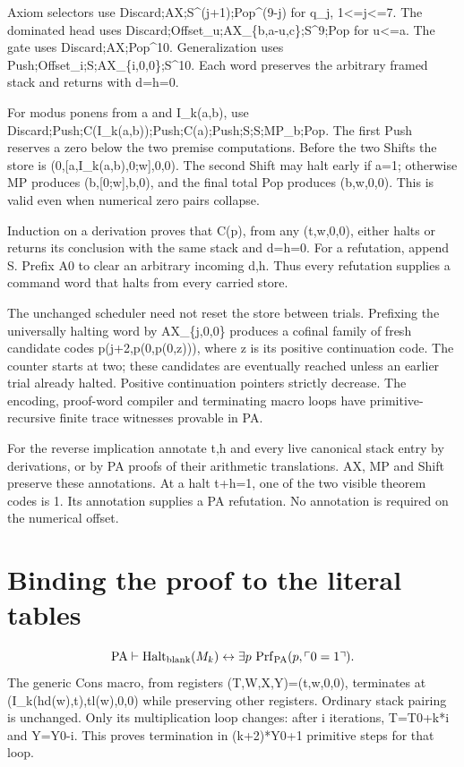 \documentclass[11pt,letterpaper]{article}
\begin{document}
Axiom selectors use Discard;AX;S\textasciicircum{}(j+1);Pop\textasciicircum{}(9-j) for q\_j, 1<=j<=7. The dominated head uses Discard;Offset\_u;AX\_\{b,a-u,c\};S\textasciicircum{}9;Pop for u<=a. The gate uses Discard;AX;Pop\textasciicircum{}10. Generalization uses Push;Offset\_i;S;AX\_\{i,0,0\};S\textasciicircum{}10. Each word preserves the arbitrary framed stack and returns with d=h=0.

For modus ponens from a and I\_k(a,b), use Discard;Push;C(I\_k(a,b));Push;C(a);Push;S;S;MP\_b;Pop. The first Push reserves a zero below the two premise computations. Before the two Shifts the store is (0,[a,I\_k(a,b),0;w],0,0). The second Shift may halt early if a=1; otherwise MP produces (b,[0;w],b,0), and the final total Pop produces (b,w,0,0). This is valid even when numerical zero pairs collapse.

Induction on a derivation proves that C(p), from any (t,w,0,0), either halts or returns its conclusion with the same stack and d=h=0. For a refutation, append S. Prefix A0 to clear an arbitrary incoming d,h. Thus every refutation supplies a command word that halts from every carried store.

The unchanged scheduler need not reset the store between trials. Prefixing the universally halting word by AX\_\{j,0,0\} produces a cofinal family of fresh candidate codes p(j+2,p(0,p(0,z))), where z is its positive continuation code. The counter starts at two; these candidates are eventually reached unless an earlier trial already halted. Positive continuation pointers strictly decrease. The encoding, proof-word compiler and terminating macro loops have primitive-recursive finite trace witnesses provable in PA.

For the reverse implication annotate t,h and every live canonical stack entry by derivations, or by PA proofs of their arithmetic translations. AX, MP and Shift preserve these annotations. At a halt t+h=1, one of the two visible theorem codes is 1. Its annotation supplies a PA refutation. No annotation is required on the numerical offset.

\section{Binding the proof to the literal tables}
\[
 \mathrm{PA}\vdash
 \operatorname{Halt}_{\rm blank}(M_k)
 \leftrightarrow
 \exists p\,\operatorname{Prf}_{\mathrm{PA}}(p,\ulcorner0=1\urcorner).
\]
The generic Cons macro, from registers (T,W,X,Y)=(t,w,0,0), terminates at (I\_k(hd(w),t),tl(w),0,0) while preserving other registers. Ordinary stack pairing is unchanged. Only its multiplication loop changes: after i iterations, T=T0+k*i and Y=Y0-i. This proves termination in (k+2)*Y0+1 primitive steps for that loop.
\end{document}
